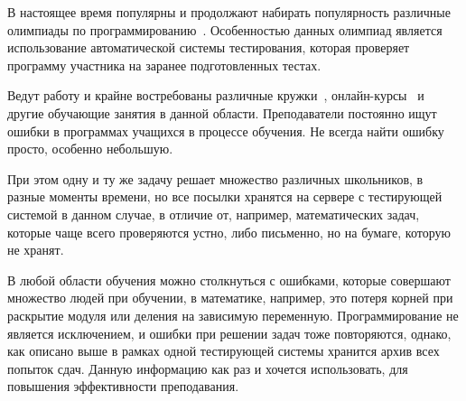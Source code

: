 \documentclass[times,specification,annotation]{itmo-student-thesis}
\begin{document}






\tableofcontents

\startprefacepage

В настоящее время популярны и продолжают набирать популярность различные олимпиады по программированию~\cite{rcc, ioip, codeforces-ru}.
Особенностью данных олимпиад является использование автоматической системы тестирования, которая проверяет
программу участника на заранее подготовленных тестах.

Ведут работу и крайне востребованы различные кружки~\cite{kalinin}, онлайн-курсы~\cite{i2cpx} 
и другие обучающие занятия в данной области.
Преподаватели постоянно ищут ошибки в программах учащихся в процессе обучения. Не всегда найти ошибку просто, 
особенно небольшую. 

При этом одну и ту же задачу решает множество различных школьников, в разные моменты времени, но все посылки
хранятся на сервере с тестирующей системой в данном случае, в отличие от, например, математических задач,
которые чаще всего проверяются устно, либо письменно, но на бумаге, которую не хранят.

В любой области обучения можно столкнуться с ошибками, которые совершают множество людей при обучении,
в математике, например, это потеря корней при раскрытие модуля или деления на зависимую переменную.
Программирование не является исключением, и ошибки при решении задач тоже повторяются, однако, как описано выше
в рамках одной тестирующей системы хранится архив всех попыток сдач. 
Данную информацию как раз и хочется использовать, для повышения эффективности преподавания.
\end{document}
